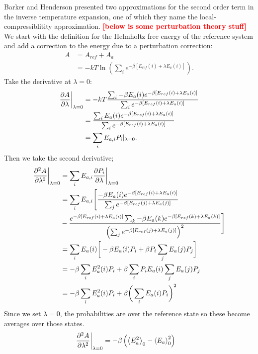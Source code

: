 \documentclass[letterpaper,twocolumn,amsmath,amssymb,pre,aps,10pt]{revtex4-1}
\newcommand\fixme[1]{\textcolor{red}{\textbf{[#1]}}}
\begin{document}
Barker and Henderson presented two approximations for the second order
term in the inverse temperature expansion, one of which they name the
local-compressiblitity
approximation. \cite{barker2004perturbationSW,barker2004perturbationII}
\fixme{below is some perturbation theory stuff}
We start with the definition for the Helmholtz free energy of the
reference system and add a correction to the energy due to a perturbation correction:
\begin{align}
  A &= A_{ref}+A_a \\
  &=-kT \ln \left( \sum_i e^{-\beta [E_{ref}(i) + \lambda E_a(i)]}
  \right).
\end{align}
Take the derivative at $\lambda = 0$:
\begin{align}
  \frac{\partial A}{\partial \lambda} \bigg{|}_{\lambda = 0} &= -kT
  \frac{\sum_i -\beta E_a(i) e^{-\beta [E_{ref}(i) + \lambda E_a(i)]}}{\sum_i e^{-\beta
      [E_{ref}(i) + \lambda E_a(i)]}} \\
  &= \frac{\sum_i E_a(i) e^{-\beta [E_{ref}(i) + \lambda E_a(i)]}}{\sum_i e^{-\beta
      [E_{ref}(i) + \lambda E_a(i)]}} \\
  &= \sum_i E_{a,i}{P_i}|_{\lambda = 0}.
\end{align}
Then we take the second derivative;
\begin{align}
  \frac{\partial^2 A}{\partial \lambda^2} \bigg{|}_{\lambda = 0} &=
  \sum_i E_{a,i} \frac{\partial P_i}{\partial
    \lambda}\bigg{|}_{\lambda = 0} \\
  &= \sum_i E_{a,i}\Bigg[ \frac{-\beta E_a(i)e^{-\beta [E_{ref}(i) +
        \lambda E_a(i)]}}{\sum_j e^{-\beta [E_{ref}(j) + \lambda E_a(j)]}}
  \notag \\
  &- \frac{e^{-\beta [E_{ref}(i) + \lambda
        E_a(i)]}\sum_k -\beta E_a(k)e^{-\beta [E_{ref}(k) + \lambda
        E_a(k)]}}{\left( \sum_j e^{-\beta [E_{ref}(j) + \lambda
        E_a(j)]} \right)^2} \Bigg] \\
  &= \sum_i E_a(i)\bigg[ -\beta E_a(i)P_i + \beta P_i \sum_j
  E_a(j)P_j \bigg] \\
  &= -\beta \sum_i E_a^2(i)P_i + \beta \sum_i P_i E_a(i)\sum_j E_a(j)
  P_j \\
  &= -\beta \sum_i E_a^2(i)P_i + \beta \bigg(\sum_i E_a(i)P_i\bigg)^2
\end{align}
Since we set $\lambda = 0$, the probabilities are over the reference state so these become
averages over those states.
\begin{align}
  \frac{\partial^2 A}{\partial \lambda^2} \bigg{|}_{\lambda = 0} &=
  -\beta \left( \left< E_a^2 \right>_0 - {\langle E_a \rangle}_0^2 \right)
\end{align}
\end{document}
